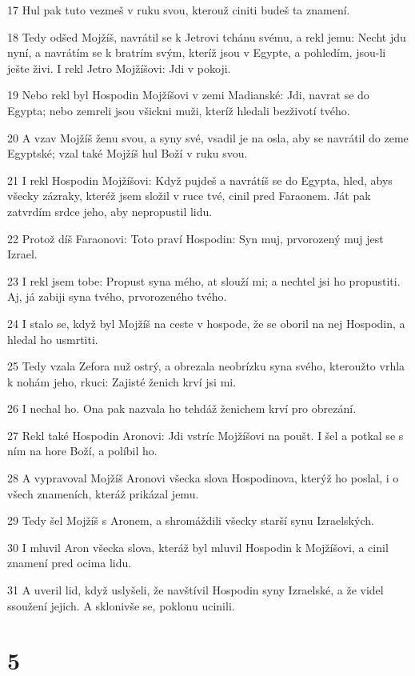 \par 17 Hul pak tuto vezmeš v ruku svou, kterouž ciniti budeš ta znamení.
\par 18 Tedy odšed Mojžíš, navrátil se k Jetrovi tchánu svému, a rekl jemu: Necht jdu nyní, a navrátím se k bratrím svým, kteríž jsou v Egypte, a pohledím, jsou-li ješte živi. I rekl Jetro Mojžíšovi: Jdi v pokoji.
\par 19 Nebo rekl byl Hospodin Mojžíšovi v zemi Madianské: Jdi, navrat se do Egypta; nebo zemreli jsou všickni muži, kteríž hledali bezživotí tvého.
\par 20 A vzav Mojžíš ženu svou, a syny své, vsadil je na osla, aby se navrátil do zeme Egyptské; vzal také Mojžíš hul Boží v ruku svou.
\par 21 I rekl Hospodin Mojžíšovi: Když pujdeš a navrátíš se do Egypta, hled, abys všecky zázraky, kteréž jsem složil v ruce tvé, cinil pred Faraonem. Ját pak zatvrdím srdce jeho, aby nepropustil lidu.
\par 22 Protož díš Faraonovi: Toto praví Hospodin: Syn muj, prvorozený muj jest Izrael.
\par 23 I rekl jsem tobe: Propust syna mého, at slouží mi; a nechtel jsi ho propustiti. Aj, já zabiji syna tvého, prvorozeného tvého.
\par 24 I stalo se, když byl Mojžíš na ceste v hospode, že se oboril na nej Hospodin, a hledal ho usmrtiti.
\par 25 Tedy vzala Zefora nuž ostrý, a obrezala neobrízku syna svého, kteroužto vrhla k nohám jeho, rkuci: Zajisté ženich krví jsi mi.
\par 26 I nechal ho. Ona pak nazvala ho tehdáž ženichem krví pro obrezání.
\par 27 Rekl také Hospodin Aronovi: Jdi vstríc Mojžíšovi na poušt. I šel a potkal se s ním na hore Boží, a políbil ho.
\par 28 A vypravoval Mojžíš Aronovi všecka slova Hospodinova, kterýž ho poslal, i o všech znameních, kteráž prikázal jemu.
\par 29 Tedy šel Mojžíš s Aronem, a shromáždili všecky starší synu Izraelských.
\par 30 I mluvil Aron všecka slova, kteráž byl mluvil Hospodin k Mojžíšovi, a cinil znamení pred ocima lidu.
\par 31 A uveril lid, když uslyšeli, že navštívil Hospodin syny Izraelské, a že videl ssoužení jejich. A sklonivše se, poklonu ucinili.

\chapter{5}

